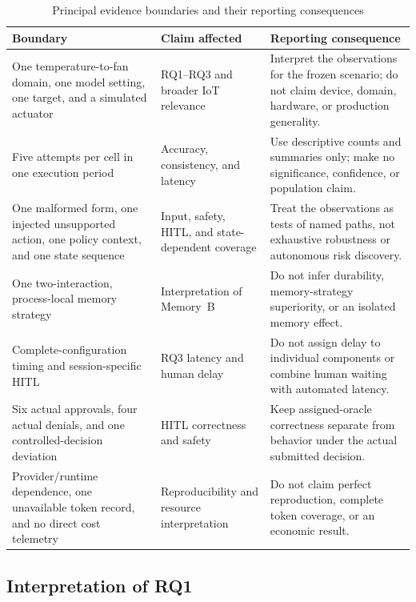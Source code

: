 \begin{table}[H]
\centering
\caption{Principal evidence boundaries and their reporting consequences}
\label{tab:discussion-limitations}
\small
\begin{tabularx}{\textwidth}{L{0.24\textwidth}L{0.35\textwidth}Y}
\toprule
\textbf{Boundary} & \textbf{Claim affected} & \textbf{Reporting consequence} \\
\midrule
One temperature-to-fan domain, one model setting, one target, and a simulated
actuator & RQ1--RQ3 and broader IoT relevance & Interpret the observations for
the frozen scenario; do not claim device, domain, hardware, or production
generality. \\
Five attempts per cell in one execution period & Accuracy, consistency, and
latency & Use descriptive counts and summaries only; make no significance,
confidence, or population claim. \\
One malformed form, one injected unsupported action, one policy context, and
one state sequence & Input, safety, HITL, and state-dependent coverage & Treat
the observations as tests of named paths, not exhaustive robustness or
autonomous risk discovery. \\
One two-interaction, process-local memory strategy & Interpretation of
Memory~B & Do not infer durability, memory-strategy superiority, or an isolated
memory effect. \\
Complete-configuration timing and session-specific HITL & RQ3 latency and human
delay & Do not assign delay to individual components or combine human waiting
with automated latency. \\
Six actual approvals, four actual denials, and one controlled-decision deviation
& HITL correctness and safety & Keep assigned-oracle correctness separate from
behavior under the actual submitted decision. \\
Provider/runtime dependence, one unavailable token record, and no direct cost
telemetry & Reproducibility and resource interpretation & Do not claim perfect
reproduction, complete token coverage, or an economic result. \\
\bottomrule
\end{tabularx}
\end{table}

\subsection{Interpretation of RQ1}\label{subsec:discussion-rq1}

